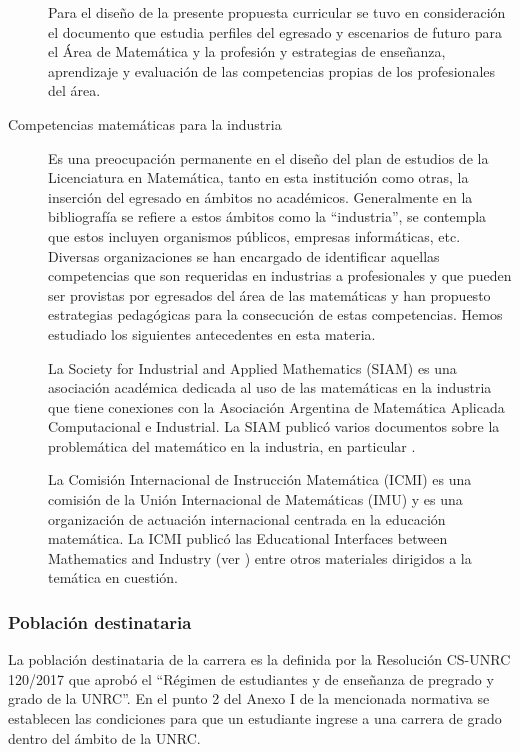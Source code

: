 \documentclass[a4paper, 12pt]{article}
\begin{document}
\begin{description}
Para el diseño de la presente propuesta curricular se tuvo en consideración el documento \cite{paniagua2013educacion} 
que estudia perfiles del egresado y escenarios de futuro para el Área de Matemática y la profesión y estrategias de enseñanza, aprendizaje y evaluación de las competencias propias de los profesionales del área. 

\item[Competencias matemáticas para la industria] 
Es una preocupación permanente en el diseño del plan de estudios de la Licenciatura en Matemática, tanto en esta institución como otras, la inserción del egresado en ámbitos no académicos. Generalmente  en la bibliografía se refiere a estos ámbitos como la ``industria'',  se contempla que estos incluyen organismos públicos, empresas informáticas, etc. Diversas organizaciones se han encargado de identificar aquellas competencias que son requeridas en industrias a profesionales y que pueden ser provistas por egresados del área de las matemáticas y han propuesto estrategias pedagógicas para la consecución de estas competencias. Hemos estudiado los siguientes antecedentes en esta materia.

La Society for Industrial and Applied Mathematics (SIAM)  es una asociación académica dedicada al uso de las matemáticas en la industria que tiene conexiones con la Asociación Argentina de Matemática Aplicada Computacional e Industrial. La SIAM publicó varios documentos sobre la problemática del matemático en la industria, en particular \cite{society1996siam,society2012siam}.


 La Comisión Internacional de Instrucción Matemática (ICMI) es una comisión de la Unión Internacional de Matemáticas (IMU) y es una organización de actuación internacional centrada en la educación matemática. La ICMI publicó las Educational Interfaces between Mathematics and Industry (ver \cite{damlamian2013educational}) entre otros materiales dirigidos a la temática en cuestión.
\end{description}



\subsubsection{Población destinataria}

La población destinataria de la carrera es la definida por la Resolución CS-UNRC 120/2017 que aprobó el ``Régimen  de estudiantes y de enseñanza de pregrado y grado de la UNRC''. En el punto 2 del Anexo I de la mencionada normativa se establecen las condiciones para que un estudiante ingrese a una carrera de grado dentro del ámbito de la UNRC.
\end{document}

